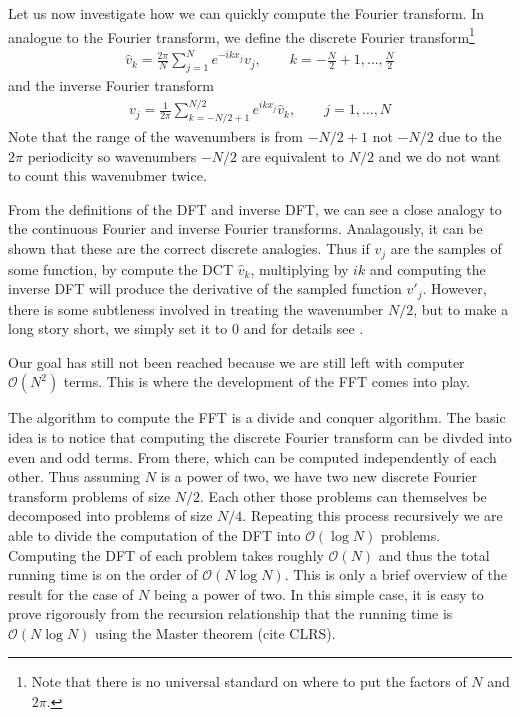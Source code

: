Let us now investigate how we can quickly compute the Fourier transform. In analogue to the Fourier transform, we define the discrete Fourier transform\footnote{Note that there is no universal standard on where to put the factors of $N$ and $2\pi$.}
\begin{align}
\hat{v}_{k} = \frac{2\pi}{N}\sum_{j=1}^{N} e^{-ikx_{j}}v_{j},\qquad k=-\frac{N}{2}+1,\ldots,\frac{N}{2}
\end{align}
and the inverse Fourier transform 
\begin{align}
v_{j} = \frac{1}{2\pi}\sum_{k=-N/2+1}^{N/2} e^{ikx_{j}}\hat{v}_{k}, \qquad j=1,\ldots, N
\end{align}
Note that the range of the wavenumbers is from $-N/2+1$ not $-N/2$ due to the $2\pi$ periodicity so wavenumbers $-N/2$ are equivalent to $N/2$ and we do not want to count this wavenubmer twice. 

From the definitions of the DFT and inverse DFT, we can see a close analogy to the continuous Fourier and inverse Fourier transforms. Analagously, it can be shown \cite{trefethen_spectral} that these are the correct discrete analogies. Thus if $v_{j}$ are the samples of some function, by compute the DCT $\hat{v}_{k}$, multiplying by $ik$ and computing the inverse DFT will produce the derivative of the sampled function $v'_{j}$. However, there is some subtleness involved in treating the wavenumber $N/2$, but to make a long story short, we simply set it to $0$ and for details see \cite{trefethen_spectral}.  

Our goal has still not been reached because we are still left with computer $\mathcal{O}(N^{2})$ terms. This is where the development of the FFT comes into play.  

The algorithm to compute the FFT is a divide and conquer algorithm. The basic idea is to notice that computing the discrete Fourier transform can be divded into even and odd terms. From there, which can be computed independently of each other. Thus assuming $N$ is a power of two, we have two new discrete Fourier transform problems of size $N/2$. Each other those problems can themselves be decomposed into problems of size $N/4$. Repeating this process recursively we are able to divide the computation of the DFT into $\mathcal{O}(\log N)$ problems. Computing the DFT of each problem takes roughly $\mathcal{O}(N)$ and thus the total running time is on the order of $\mathcal{O}(N\log N)$. This is only a brief overview of the result for the case of $N$ being a power of two. In this simple case, it is easy to prove rigorously from the recursion relationship that the running time is $\mathcal{O}(N\log N)$ using the Master theorem (cite CLRS). 

